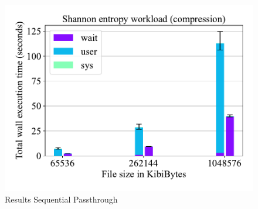 \begin{figure}
    \centering
	\includegraphics[width=1\textwidth]{resources/images/results-shannon-upper.pdf}
	\caption{Results Sequential Passthrough}
    \label{figure:moduledependencies}
\end{figure}

